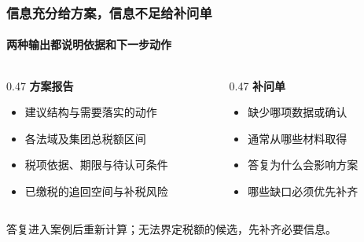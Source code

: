 \documentclass[english, sectionpage=false]{tumbeamer}
\newcommand{\subnote}[1]{{\small\color{TUMGrayDark} #1}}
\newcommand{\lead}[1]{{\large\bfseries\color{TUMBlue} #1}}
\begin{document}
\begin{frame}
  \frametitle{信息充分给方案，信息不足给补问单}
  \framesubtitle{两种输出都说明依据和下一步动作}
  \begin{columns}[T]
    \begin{column}{0.47\textwidth}
      \lead{方案报告}\par\vspace{0.6em}
      \begin{itemize}
        \setlength{\itemsep}{0.55em}
        \item 建议结构与需要落实的动作
        \item 各法域及集团总税额区间
        \item 税项依据、期限与待认可条件
        \item 已缴税的追回空间与补税风险
      \end{itemize}
    \end{column}
    \begin{column}{0.47\textwidth}
      \lead{补问单}\par\vspace{0.6em}
      \begin{itemize}
        \setlength{\itemsep}{0.55em}
        \item 缺少哪项数据或确认
        \item 通常从哪些材料取得
        \item 答复为什么会影响方案
        \item 哪些缺口必须优先补齐
      \end{itemize}
    \end{column}
  \end{columns}
  \vspace{0.7em}
  \subnote{答复进入案例后重新计算；无法界定税额的候选，先补齐必要信息。}
\end{frame}
\end{document}
